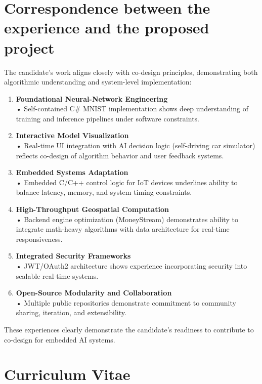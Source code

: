 \section{Correspondence between the experience and the proposed project}

The candidate’s work aligns closely with co-design principles, demonstrating both algorithmic understanding and system-level implementation:

\begin{enumerate}
    \item \textbf{Foundational Neural-Network Engineering} \\
    • Self-contained C\# MNIST implementation shows deep understanding of training and inference pipelines under software constraints.

    \item \textbf{Interactive Model Visualization} \\
    • Real-time UI integration with AI decision logic (self-driving car simulator) reflects co-design of algorithm behavior and user feedback systems.

    \item \textbf{Embedded Systems Adaptation} \\
    • Embedded C/C++ control logic for IoT devices underlines ability to balance latency, memory, and system timing constraints.

    \item \textbf{High-Throughput Geospatial Computation} \\
    • Backend engine optimization (MoneyStream) demonstrates ability to integrate math-heavy algorithms with data architecture for real-time responsiveness.

    \item \textbf{Integrated Security Frameworks} \\
    • JWT/OAuth2 architecture shows experience incorporating security into scalable real-time systems.

    \item \textbf{Open-Source Modularity and Collaboration} \\
    • Multiple public repositories demonstrate commitment to community sharing, iteration, and extensibility.
\end{enumerate}

These experiences clearly demonstrate the candidate’s readiness to contribute to co-design for embedded AI systems.

\section{Curriculum Vitae}



